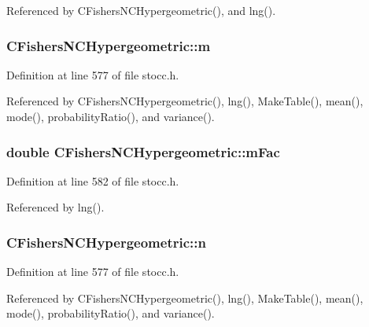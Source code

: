 Referenced by C\-Fishers\-N\-C\-Hypergeometric(), and lng().

\subsubsection[{m}]{ C\-Fishers\-N\-C\-Hypergeometric\-::m\hspace{0.3cm}{\ttfamily [protected]}}\label{class_c_fishers_n_c_hypergeometric_a498bdbd9b41fde5cf5d959a7a78ee0ca}


Definition at line 577 of file stocc.\-h.



Referenced by C\-Fishers\-N\-C\-Hypergeometric(), lng(), Make\-Table(), mean(), mode(), probability\-Ratio(), and variance().

\subsubsection[{m\-Fac}]{\setlength{\rightskip}{0pt plus 5cm}double C\-Fishers\-N\-C\-Hypergeometric\-::m\-Fac\hspace{0.3cm}{\ttfamily [protected]}}\label{class_c_fishers_n_c_hypergeometric_af2a34868eb61ad2487638cb955111e86}


Definition at line 582 of file stocc.\-h.



Referenced by lng().

\subsubsection[{n}]{ C\-Fishers\-N\-C\-Hypergeometric\-::n\hspace{0.3cm}{\ttfamily [protected]}}\label{class_c_fishers_n_c_hypergeometric_ab33abdef674edb97670e773ed3b91c0b}


Definition at line 577 of file stocc.\-h.



Referenced by C\-Fishers\-N\-C\-Hypergeometric(), lng(), Make\-Table(), mean(), mode(), probability\-Ratio(), and variance().


